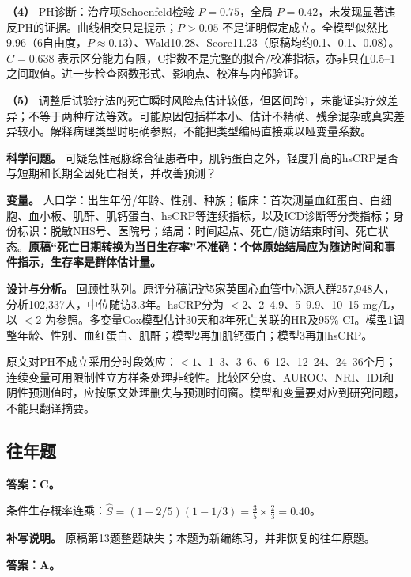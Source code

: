 \textbf{（4）} PH诊断：治疗项Schoenfeld检验 \(P=0.75\)，全局 \(P=0.42\)，未发现显著违反PH的证据。曲线相交只是提示；\(P>0.05\) 不是证明假定成立。全模型似然比9.96（6自由度，\(P\approx0.13\)）、Wald10.28、Score11.23（原稿均约0.1、0.1、0.08）。\(C=0.638\) 表示区分能力有限，C指数不是完整的拟合/校准指标，亦非只在0.5--1之间取值。进一步检查函数形式、影响点、校准与内部验证。

\textbf{（5）} 调整后试验疗法的死亡瞬时风险点估计较低，但区间跨1，未能证实疗效差异；不等于两种疗法等效。可能原因包括样本小、估计不精确、残余混杂或真实差异较小。解释病理类型时明确参照，不能把类型编码直接乘以哑变量系数。



\textbf{科学问题。} 可疑急性冠脉综合征患者中，肌钙蛋白之外，轻度升高的hsCRP是否与短期和长期全因死亡相关，并改善预测？

\textbf{变量。} 人口学：出生年份/年龄、性别、种族；临床：首次测量血红蛋白、白细胞、血小板、肌酐、肌钙蛋白、hsCRP等连续指标，以及ICD诊断等分类指标；身份标识：脱敏NHS号、医院号；结局：时间起点、死亡/随访结束时间、死亡状态。\textbf{原稿``死亡日期转换为当日生存率''不准确：个体原始结局应为随访时间和事件指示，生存率是群体估计量。}

\textbf{设计与分析。} 回顾性队列。原评分稿记述5家英国心血管中心源人群257,948人，分析102,337人，中位随访3.3年。hsCRP分为 \(<2\)、2--4.9、5--9.9、10--15 mg/L，以 \(<2\) 为参照。多变量Cox模型估计30天和3年死亡关联的HR及95\% CI。模型1调整年龄、性别、血红蛋白、肌酐；模型2再加肌钙蛋白；模型3再加hsCRP。

原文对PH不成立采用分时段效应：\(<1\)、1--3、3--6、6--12、12--24、24--36个月；连续变量可用限制性立方样条处理非线性。比较区分度、AUROC、NRI、IDI和阴性预测值时，应按原文处理删失与预测时间窗。模型和变量要对应到研究问题，不能只翻译摘要。


\subsection{往年题}


\textbf{答案：C。}

条件生存概率连乘：\(\widehat S=(1-2/5)(1-1/3)=\frac35\times\frac23=0.40\)。

\textbf{补写说明。} 原稿第13题整题缺失；本题为新编练习，并非恢复的往年原题。



\textbf{答案：A。}


